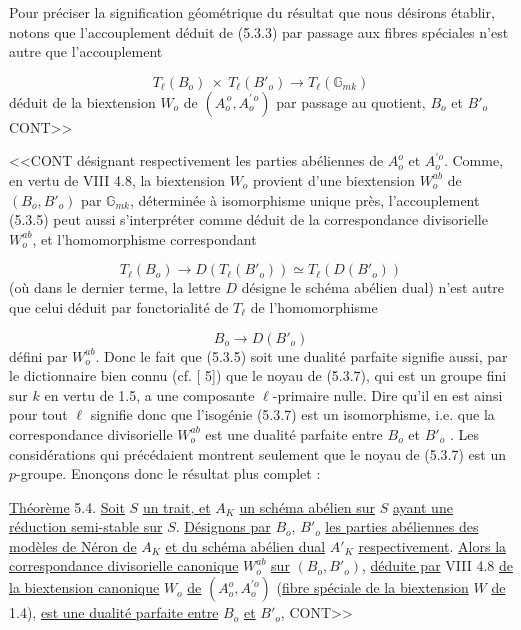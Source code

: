 Pour préciser la signification géométrique du résultat que nous désirons établir, notons que l'accouplement déduit de (5.3.3) par passage aux fibres spéciales n'est autre que l'accouplement

\begin{equation}\tag{5.3.5}
T_\ell(B_o) \ \times \ T_\ell(B'_o) \longrightarrow T_\ell(\mathbb{G}_{mk})
\end{equation}
déduit de la biextension $W_o$ de $(A_o^{\,o}, A_o^{\prime\,o})$ par passage au quotient, $B_o$ et $B'_o$ CONT>>



<<CONT désignant respectivement les parties abéliennes de $A_o^o$ et $A_o^{\prime o}$. Comme, en vertu de VIII 4.8, la biextension $W_o$ provient d'une biextension $W_o^{ab}$ de $(B_o,B'_o)$ par $\mathbb{G}_{mk}$, déterminée à isomorphisme unique près, l'accouplement (5.3.5) peut aussi s'interpréter comme déduit de la correspondance divisorielle $W_o^{ab}$, et l'homomorphisme correspondant

\begin{equation}\tag{5.3.6}
T_\ell(B_o) \longrightarrow D(T_\ell(B'_o)) \simeq T_\ell(D(B'_o))
\end{equation}
(où dans le dernier terme, la lettre $D$ désigne le schéma abélien dual) n'est autre que celui déduit par fonctorialité de $T_\ell$ de l'homomorphisme

\begin{equation}\tag{5.3.7}
B_o \longrightarrow D(B'_o)
\end{equation}
défini par $W_o^{ab}$. Donc le fait que (5.3.5) soit une dualité parfaite signifie aussi, par le dictionnaire bien connu (cf. [ 5]) que le noyau de (5.3.7), qui est un groupe fini sur $k$ en vertu de 1.5, a une composante $\ell$-primaire nulle. Dire qu'il en est ainsi pour tout $\ell$ signifie donc que l'isogénie (5.3.7) est un isomorphisme, i.e. que la correspondance divisorielle $W_o^{ab}$ est une dualité parfaite entre $B_o$ et $B'_o$ . Les considérations qui précédaient montrent seulement que le noyau de (5.3.7) est un $p$-groupe. Enonçons donc le résultat plus complet :

\underline{Théorème} 5.4. \underline{Soit} $S$ \underline{un trait, et} $A_K$ \underline{un schéma abélien sur} $S$ \underline{ayant une réduction semi-stable sur} $S$. \underline{Désignons par} $B_o$, $B'_o$ \underline{les parties abéliennes des modèles de Néron de} $A_K$ \underline{et du schéma abélien dual} $A'_K$ \underline{respectivement}. \underline{Alors la correspondance divisorielle canonique} $W_o^{ab}$ \underline{sur} $(B_o,B'_o)$, \underline{déduite par} VIII 4.8 \underline{de la biextension canonique} $W_o$ \underline{de} $(A_o^o,A_o^{\prime o})$ (\underline{fibre spéciale de la biextension} $W$ \underline{de} 1.4), \underline{est une dualité parfaite entre} $B_o$ \underline{et} $B'_o$, CONT>>


